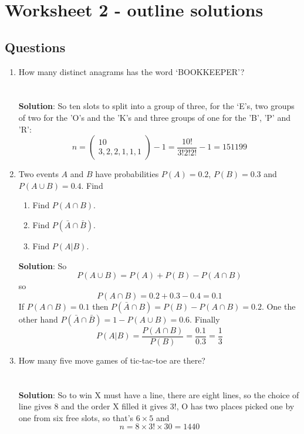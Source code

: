 \documentclass[11pt,a4paper]{scrartcl}
\begin{document}
\section*{Worksheet 2 - outline solutions}

\subsection*{Questions}

\begin{enumerate}
\item How many distinct anagrams has the word `BOOKKEEPER'?\\ \\ \\
  \textbf{Solution}: So ten slots to split into a group of three, for the `E's, two groups of two for the 'O's and the 'K's and three groups of one for the 'B', 'P' and 'R':
  \begin{equation}
      n=\left(\begin{array}{c}10\\3,2,2,1,1,1\end{array}\right)-1=\frac{10!}{3!2!2!}-1=151199
  \end{equation}

  
\item Two events $A$ and $B$ have probabilities $P(A)=0.2$, $P(B)=0.3$ and $P(A\cup B)=0.4$. Find
\begin{enumerate}
\item Find $P(A\cap B)$.
\item Find $P(\bar{A}\cap \bar{B})$.
\item Find $P(A|B)$.
\end{enumerate}
\textbf{Solution}: So
\begin{equation}
P(A\cup B)=P(A)+P(B)-P(A\cap B)
\end{equation}
so 
\begin{equation}
P(A\cap B)=0.2+0.3-0.4=0.1
\end{equation}
If $P(A\cap B)=0.1$ then $P(\bar{A}\cap B)=P(B)-P(A\cap B)=0.2$. One the other hand
$P(\bar{A}\cap \bar{B})=1-P(A\cup B)=0.6$. Finally
\begin{equation}
P(A|B)=\frac{P(A\cap B)}{P(B)}=\frac{0.1}{0.3}=\frac{1}{3}
\end{equation}

\item How many five move games of tic-tac-toe are there?\\ \\ \\
  \textbf{Solution}: So to win X must have a line, there are eight lines, so the choice of line gives $8$ and the order X filled it gives $3!$, O has two places picked one by one from six free slots, so that's $6\times 5$ and
  \begin{equation}
    n=8\times 3!\times 30 = 1440
  \end{equation}



\end{enumerate}
\end{document}

